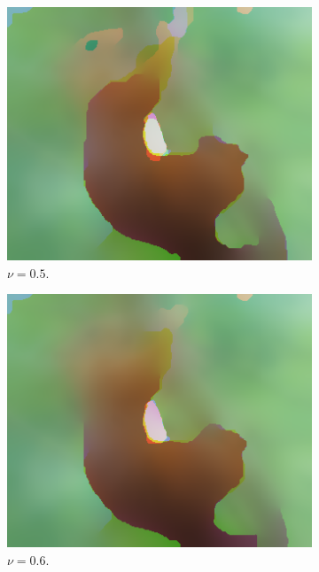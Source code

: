 \documentclass[abstracton]{scrreprt}
\begin{document}
\begin{figure}[!ht]
\begin{subfigure}[b]{0.16\textwidth}
                    \includegraphics[width=\textwidth]{img/segmentation/rt/05squirrel.png}
                    \caption{$\nu = 0.5$.}
                \end{subfigure}
                \begin{subfigure}[b]{0.16\textwidth}
                    \includegraphics[width=\textwidth]{img/segmentation/rt/06squirrel.png}
                    \caption{$\nu = 0.6$.}
                \end{subfigure}
                \begin{subfigure}[b]{0.16\textwidth}

\end{subfigure}
\end{figure}
\end{document}
